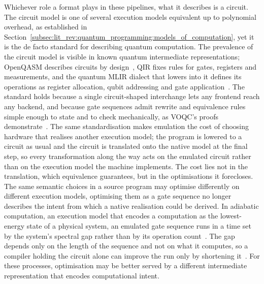 Whichever role a format plays in these pipelines, what it describes is a circuit.
The circuit model is one of several execution models equivalent up to polynomial overhead, as established in Section~\ref{subsec:lit_rev:quantum_programming:models_of_computation}, yet it is the de facto standard for describing quantum computation.
The prevalence of the circuit model is visible in known quantum intermediate representations; OpenQASM describes circuits by design~\cite{cross2017openqasm}, QIR fixes rules for gates, registers and measurements, and the quantum MLIR dialect that lowers into it defines its operations as register allocation, qubit addressing and gate application~\cite{McCaskey2021MLIRDialectQASM}.
The standard holds because a single circuit-shaped interchange lets any frontend reach any backend, and because gate sequences admit rewrite and equivalence rules simple enough to state and to check mechanically, as VOQC's proofs demonstrate~\cite{hietala2023voqc}.
The same standardisation makes emulation the cost of choosing hardware that realises another execution model; the program is lowered to a circuit as usual and the circuit is translated onto the native model at the final step, so every transformation along the way acts on the emulated circuit rather than on the execution model the machine implements.
The cost lies not in the translation, which equivalence guarantees, but in the optimisations it forecloses.
The same semantic choices in a source program may optimise differently on different execution models, optimising them as a gate sequence no longer describes the intent from which a native realisation could be derived.
In adiabatic computation, an execution model that encodes a computation as the lowest-energy state of a physical system, an emulated gate sequence runs in a time set by the system's spectral gap rather than by its operation count~\cite{aharonov2007adiabatic}.
The gap depends only on the length of the sequence and not on what it computes, so a compiler holding the circuit alone can improve the run only by shortening it~\cite{aharonov2007adiabatic}.
For these processes, optimisation may be better served by a different intermediate representation that encodes computational intent.

